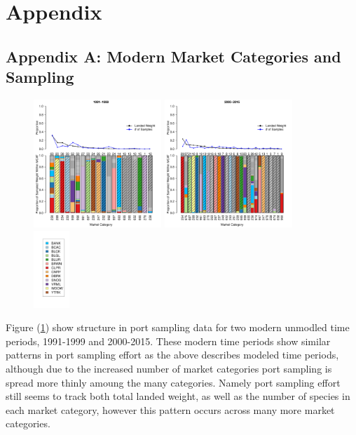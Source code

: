 \documentclass[12pt]{article}
\begin{document}
\section{Appendix}\label{appendix}

\subsection{Appendix A: Modern Market Categories and Sampling}\label{appA}

\begin{figure}[h!]
\centering
\includegraphics[width=0.43\textwidth]{./pictures/1991to1999Bar3.pdf}
\includegraphics[width=0.43\textwidth]{./pictures/2000to2015Bar3.pdf}
\includegraphics[width=0.12\textwidth]{./pictures/barplotLegend.pdf}
\caption{}
\label{bar9100}
\end{figure}

Figure (\ref{bar9100}) show structure in port sampling data for two
modern unmodled time periods, 1991-1999 and 2000-2015. These modern time
periods show similar patterns in port sampling effort as the above
describes modeled time periods, although due to the increased number of
market categories port sampling is spread more thinly amoung the many
categories. Namely port sampling effort still seems to track both total
landed weight, as well as the number of species in each market category,
however this pattern occurs across many more market categories.
\end{document}
